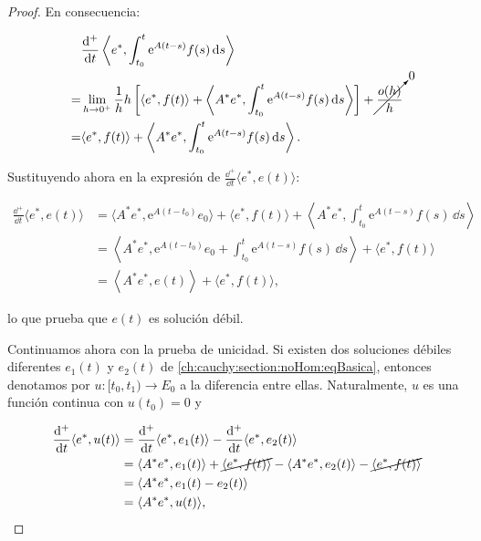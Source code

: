 \begin{proof}
    En consecuencia:

    \begin{align*}
        &\frac{\mathrm{d}^+}{\mathrm{d} t} \left \langle e^*, \int_{t_0}^t \mathrm{e}^{A(t-s)}f(s) \, \mathrm{d} s\right \rangle\\
        =& \lim_{h \rightarrow 0^+} \frac{1}{h} h \left[ \langle e^*, f(t) \rangle + \left \langle A^* e^*, \int_{t_0}^{t}\mathrm{e}^{A(t - s)}f(s) \, \mathrm{d} s \right \rangle \right] + \cancelto{0}{\frac{o(h)}{h}}\\
        =& \langle e^*, f(t) \rangle + \left \langle A^* e^*, \int_{t_0}^{t}\mathrm{e}^{A(t - s)}f(s) \, \mathrm{d} s \right \rangle.
    \end{align*}

    Sustituyendo ahora en la expresión de $\frac{\dd^+}{\dd t} \Big \langle e^*, e(t) \Big \rangle$:

    \begin{align*}
        \frac{\dd^+}{\dd t} \Big \langle e^*, e(t) \Big \rangle &= \langle A^* e^*, \mathrm{e}^{A(t-t_0)}e_0 \rangle + \langle e^*, f(t) \rangle + \left \langle A^* e^*, \int_{t_0}^{t}\mathrm{e}^{A(t - s)}f(s) \, \dd s \right \rangle\\
        &= \left \langle A^* e^*, \mathrm{e}^{A(t-t_0)}e_0 + \int_{t_0}^{t}\mathrm{e}^{A(t - s)}f(s) \, \dd s \right \rangle + \langle e^*, f(t) \rangle\\
        &=  \left \langle A^* e^*, e(t) \right \rangle + \langle e^*, f(t) \rangle,
    \end{align*}

    lo que prueba que $e(t)$ es solución débil.

    Continuamos ahora con la prueba de unicidad. Si existen dos soluciones débiles diferentes $e_1(t)$ y $e_2(t)$ de \eqref{ch:cauchy:section:noHom:eqBasica}, entonces denotamos por $u : [t_0, t_1) \rightarrow E_0$ a la diferencia entre ellas. Naturalmente, $u$ es una función continua con $u(t_0) = 0$ y 

    \begin{align*}
        \frac{\mathrm{d}^+}{\mathrm{d} t}\langle e^*, u(t) \rangle &= \frac{\mathrm{d}^+}{\mathrm{d} t} \langle e^*, e_1(t) \rangle -  \frac{\mathrm{d}^+}{\mathrm{d} t} \langle e^*, e_2(t) \rangle\\
        &= \langle A^* e^*, e_1(t) \rangle + \cancel{\langle e^*, f(t) \rangle} - \langle A^* e^*, e_2(t) \rangle - \cancel{\langle e^*, f(t) \rangle}\\
        &= \langle A^* e^*, e_1(t) - e_2(t) \rangle\\
        &= \langle A^* e^*, u(t) \rangle,
    \end{align*}


\end{proof}
